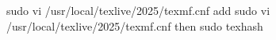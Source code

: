 sudo vi /usr/local/texlive/2025/texmf.cnf
add sudo vi /usr/local/texlive/2025/texmf.cnf
then sudo texhash
